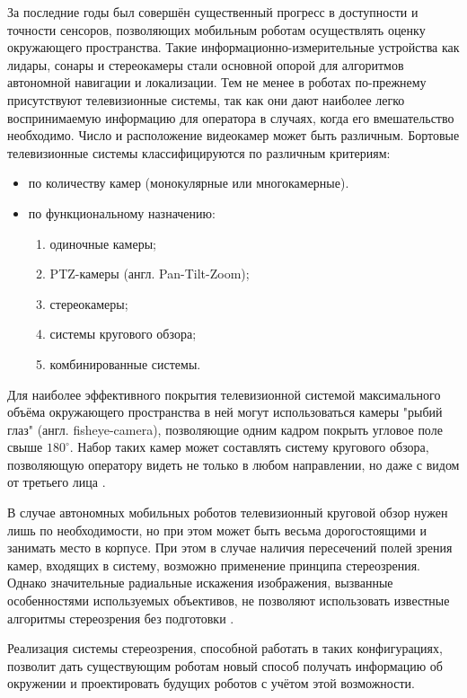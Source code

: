 За последние годы был совершён существенный прогресс в доступности и точности сенсоров, позволяющих мобильным роботам 
осуществлять оценку окружающего пространства. Такие информационно-измерительные устройства как лидары, сонары и стереокамеры
 стали основной опорой для алгоритмов автономной навигации и локализации. Тем не менее в роботах по-прежнему 
присутствуют телевизионные системы, так как они дают наиболее легко воспринимаемую информацию для оператора в случаях, когда 
его вмешательство необходимо. 
Число и расположение видеокамер может быть различным. Бортовые телевизионные системы классифицируются по различным 
критериям\cite{varlashin}:
\begin{itemize} 
    \item по количеству камер (монокулярные или многокамерные).
    \item по функциональному назначению:
    \begin{enumerate} 
        \item одиночные камеры;
        \item PTZ-камеры (англ. Pan-Tilt-Zoom);
        \item стереокамеры;
        \item системы кругового обзора;
        \item комбинированные системы.
    \end{enumerate}
\end{itemize}

Для наиболее эффективного покрытия телевизионной системой максимального объёма окружающего пространства в ней могут использоваться 
камеры "рыбий глаз" (англ. fisheye-camera), позволяющие одним кадром покрыть угловое поле свыше $180^\circ$.  
Набор таких камер может составлять систему кругового обзора, позволяющую оператору видеть не только в любом направлении,                
но даже с видом от третьего лица \cite{birdeye}. 
    
В случае автономных мобильных роботов телевизионный круговой обзор нужен лишь по необходимости, но при этом может быть весьма 
дорогостоящими и занимать место в корпусе. При этом в случае наличия пересечений полей зрения камер, входящих в систему, возможно 
применение принципа стереозрения.
Однако значительные радиальные искажения изображения, вызванные особенностями используемых объективов,
 не позволяют использовать известные алгоритмы стереозрения без подготовки .                                   
 
  Реализация системы стереозрения, способной работать в таких
конфигурациях, позволит дать существующим роботам новый способ получать информацию об окружении и проектировать будущих роботов 
с учётом этой возможности. 

